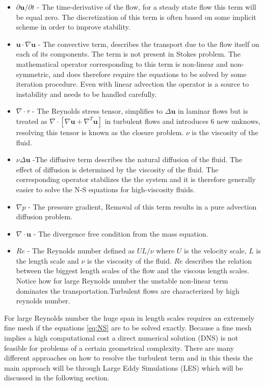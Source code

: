 \begin{itemize}
    \item $\partial \mathbf{u} /\partial t$
     - The time-derivative of the flow, for a steady state flow this term will be equal zero.
             The discretization of this term is often based on some implicit scheme in order to improve stability.  
    \item $\mathbf{u} \cdot \nabla \mathbf{u}$
     - The convective term, describes the transport due to the flow itself on each of its components. 
    The term is not present in Stokes problem.
    The mathematical operator corresponding to this term is non-linear and non-symmetric, and does therefore require the equations to be solved 
    by some iteration procedure. Even with linear advection the operator is a source to instability and needs to be handled carefully. 
\item  $\nabla \cdot \tau$ 
       - The Reynolds stress tensor, simplifies to $ \Delta \mathbf{u}$ in laminar flows but is treated as 
       $\nabla \cdot [ \nabla \mathbf{u} + \nabla^T \mathbf{u}] $ in turbulent flows and introduces 
       6 new unknows, resolving this tensor is known as the closure problem. $\nu$ is the viscosity of the fluid.
    \item $\nu \Delta \mathbf{u}$ 
    -The diffusive term describes the natural diffusion of the fluid. The effect of diffusion is determined by the 
    viscosity of the fluid. The corresponding operator stabilizes the the system and it is therefore generally easier
    to solve the N-S equations for high-viscosity fluids. 
    \item $\nabla p$
    - The pressure gradient, Removal of this term results in a pure advection diffusion problem.
    \item $\nabla \cdot \mathbf{u}$ 
    - The divergence free condition from the mass equation.
    \item $Re$ 
    - The Reynolds number defined as $UL/\nu$ where $U$ is the velocity scale, $L$ is the length scale and $\nu$ 
      is the viscosity of the fluid. $Re$ describes the relation between the biggest length scales of the flow
      and the viscous length scales. Notice how for large Reynolds number the unstable non-linear term 
      dominates the transportation.Turbulent flows are characterized by high reynolds number.
\end{itemize}
For large Reynolds number the huge span in length scales requires an extremely fine mesh if the equations \ref{eq:NS} 
are to be solved exactly. Because a fine mesh implies a high computational cost a direct numerical solution (DNS) is not feasible for 
problems of a certain geometrical complexity. There are many different approaches on how to resolve the turbulent term and in 
this thesis the main approach will be through Large Eddy Simulations (LES) which will be discussed 
in the following section.
%
%
